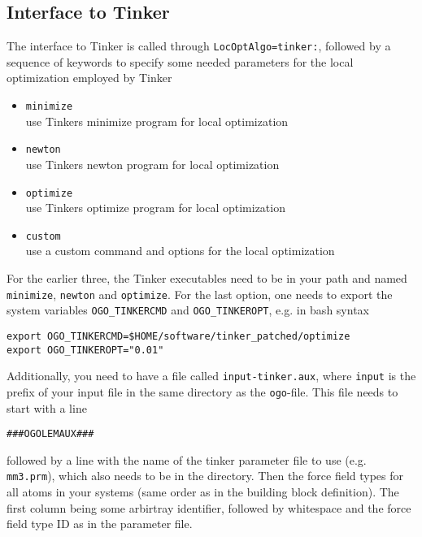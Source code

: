\documentclass[a4paper,10pt]{scrbook}
\begin{document}
\subsection{Interface to Tinker}
The interface to Tinker is called through \texttt{LocOptAlgo=tinker:}, followed
by a sequence of keywords to specify some needed parameters for the local
optimization employed by Tinker
\begin{itemize}
  \item \texttt{minimize}\\
	use Tinkers minimize program for local optimization
  \item \texttt{newton}\\
	use Tinkers newton program for local optimization
  \item \texttt{optimize}\\
	use Tinkers optimize program for local optimization
  \item \texttt{custom}\\
	use a custom command and options for the local optimization
\end{itemize}

For the earlier three, the Tinker executables need to be in your path and named
\texttt{minimize}, \texttt{newton} and \texttt{optimize}. For the last option,
one needs to export the system variables \texttt{OGO\_TINKERCMD} and
\texttt{OGO\_TINKEROPT}, e.g. in bash syntax
\begin{verbatim}
export OGO_TINKERCMD=$HOME/software/tinker_patched/optimize
export OGO_TINKEROPT="0.01"
\end{verbatim}

Additionally, you need to have a file called \texttt{input-tinker.aux}, where
\texttt{input} is the prefix of your input file in the same directory as the
\texttt{ogo}-file. This file needs to start with a line
\begin{verbatim}
###OGOLEMAUX###
\end{verbatim}
followed by a line with the name of the tinker parameter file to use (e.g.
\texttt{mm3.prm}), which also needs to be in the directory. Then the force
field types for all atoms in your systems (same order as in the building block
definition). The first column being some arbirtray identifier, followed by
whitespace and the force field type ID as in the parameter file.
\end{document}
